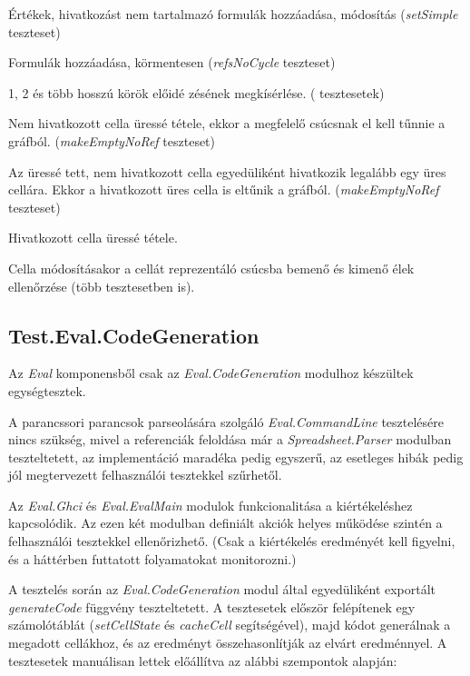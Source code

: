 \begin{compactenum}
	\item Értékek, hivatkozást nem tartalmazó formulák hozzáadása, módosítás (\textit{setSimple} teszteset)
	\item Formulák hozzáadása, körmentesen (\textit{refsNoCycle} teszteset)
	\item 1, 2 és több hosszú körök előidé	zésének megkísérlése. ( tesztesetek)
	\item Nem hivatkozott cella üressé tétele, ekkor a megfelelő csúcsnak el kell tűnnie a gráfból. (\textit{makeEmptyNoRef} teszteset)
	\item Az üressé tett, nem hivatkozott cella egyedüliként hivatkozik legalább egy üres cellára. Ekkor a hivatkozott üres cella is eltűnik a gráfból. (\textit{makeEmptyNoRef} teszteset)
	\item Hivatkozott cella üressé tétele.
	\item Cella módosításakor a cellát reprezentáló csúcsba bemenő és kimenő élek ellenőrzése (több tesztesetben is).
\end{compactenum}

\subsection{Test.Eval.CodeGeneration}

Az \textit{Eval} komponensből csak az \textit{Eval.CodeGeneration} modulhoz készültek egységtesztek. 

A parancssori parancsok parseolására szolgáló \textit{Eval.CommandLine} tesztelésére nincs szükség, mivel a referenciák feloldása már a \textit{Spreadsheet.Parser} modulban teszteltetett, az implementáció maradéka pedig egyszerű, az esetleges hibák pedig jól megtervezett felhasználói tesztekkel szűrhetől.

Az \textit{Eval.Ghci} és \textit{Eval.EvalMain} modulok funkcionalitása a kiértékeléshez kapcsolódik. Az ezen két modulban definiált akciók helyes működése szintén a felhasználói tesztekkel ellenőrizhető. (Csak a kiértékelés eredményét kell figyelni, és a háttérben futtatott folyamatokat monitorozni.)

A tesztelés során az \textit{Eval.CodeGeneration} modul által egyedüliként exportált \textit{generateCode} függvény teszteltetett. A tesztesetek először felépítenek egy számolótáblát (\textit{setCellState} és \textit{cacheCell} segítségével), majd kódot generálnak a megadott cellákhoz, és az eredményt összehasonlítják az elvárt eredménnyel. A tesztesetek manuálisan lettek előállítva az alábbi szempontok alapján: 

